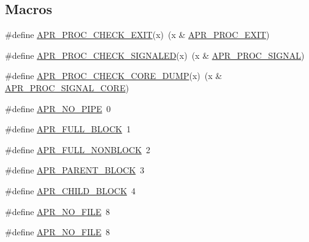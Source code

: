 \subsection*{Macros}
\begin{DoxyCompactItemize}
\item 
\#define \hyperlink{group__apr__thread__proc_ga689b0f3953cde83a4092931bad8b7183}{A\-P\-R\-\_\-\-P\-R\-O\-C\-\_\-\-C\-H\-E\-C\-K\-\_\-\-E\-X\-I\-T}(x)~(x \& \hyperlink{group__apr__thread__proc_ggac097b4fa41e67024711c5983446d0951a977f140c82333af62aa4bed8c99a3ee2}{A\-P\-R\-\_\-\-P\-R\-O\-C\-\_\-\-E\-X\-I\-T})
\item 
\#define \hyperlink{group__apr__thread__proc_gaa0a8a0b8785cc9392059c7accd71f5f6}{A\-P\-R\-\_\-\-P\-R\-O\-C\-\_\-\-C\-H\-E\-C\-K\-\_\-\-S\-I\-G\-N\-A\-L\-E\-D}(x)~(x \& \hyperlink{group__apr__thread__proc_ggac097b4fa41e67024711c5983446d0951a7e3421d18abe458ca27822d19424225b}{A\-P\-R\-\_\-\-P\-R\-O\-C\-\_\-\-S\-I\-G\-N\-A\-L})
\item 
\#define \hyperlink{group__apr__thread__proc_ga2249e96191b5d98d33fb7875bce49410}{A\-P\-R\-\_\-\-P\-R\-O\-C\-\_\-\-C\-H\-E\-C\-K\-\_\-\-C\-O\-R\-E\-\_\-\-D\-U\-M\-P}(x)~(x \& \hyperlink{group__apr__thread__proc_ggac097b4fa41e67024711c5983446d0951a6b667be4983cb59e9bed37ee05a0dcce}{A\-P\-R\-\_\-\-P\-R\-O\-C\-\_\-\-S\-I\-G\-N\-A\-L\-\_\-\-C\-O\-R\-E})
\item 
\#define \hyperlink{group__apr__thread__proc_gab7cfcb8ed24e6c0a76cd41b5b113ae95}{A\-P\-R\-\_\-\-N\-O\-\_\-\-P\-I\-P\-E}~0
\item 
\#define \hyperlink{group__apr__thread__proc_ga646af57314e71f4647243f36dd03e5ea}{A\-P\-R\-\_\-\-F\-U\-L\-L\-\_\-\-B\-L\-O\-C\-K}~1
\item 
\#define \hyperlink{group__apr__thread__proc_gae0707f76da785490830fc3491093767c}{A\-P\-R\-\_\-\-F\-U\-L\-L\-\_\-\-N\-O\-N\-B\-L\-O\-C\-K}~2
\item 
\#define \hyperlink{group__apr__thread__proc_ga8653bab028b1c2b98754babc2547f988}{A\-P\-R\-\_\-\-P\-A\-R\-E\-N\-T\-\_\-\-B\-L\-O\-C\-K}~3
\item 
\#define \hyperlink{group__apr__thread__proc_gacad9da4db7a22f46715e50fb8ec1c939}{A\-P\-R\-\_\-\-C\-H\-I\-L\-D\-\_\-\-B\-L\-O\-C\-K}~4
\item 
\#define \hyperlink{group__apr__thread__proc_ga597fb6a501c20cc3a597fe6c613f4310}{A\-P\-R\-\_\-\-N\-O\-\_\-\-F\-I\-L\-E}~8
\item 
\#define \hyperlink{group__apr__thread__proc_ga597fb6a501c20cc3a597fe6c613f4310}{A\-P\-R\-\_\-\-N\-O\-\_\-\-F\-I\-L\-E}~8

\end{DoxyCompactItemize}
